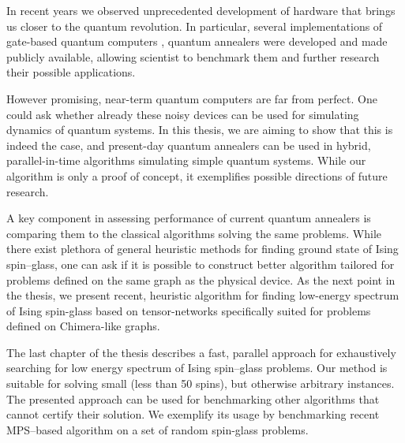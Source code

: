 In recent years we observed unprecedented development of hardware that brings us closer to the quantum revolution. In particular, several implementations of gate-based quantum computers \cite{ionq, bohnet}, quantum annealers \cite{johnson, dattani} were developed and made publicly available, allowing scientist to benchmark them and further research their possible applications.

However promising, near-term quantum computers are far from perfect. One could ask whether already these noisy devices can be used for simulating dynamics of quantum systems. In this thesis, we are aiming to show that this is indeed the case, and present-day quantum annealers can be used in hybrid, parallel-in-time algorithms simulating simple quantum systems. While our algorithm is only a proof of concept, it exemplifies possible directions of future research.

A key component in assessing performance of current quantum annealers is comparing them to the classical algorithms solving the same problems. While there exist plethora of general heuristic methods for finding ground state of Ising spin--glass, one can ask if it is possible to construct better algorithm tailored for problems defined on the same graph as the physical device. As the next point in the thesis, we present recent, heuristic algorithm for finding low-energy spectrum of Ising spin-glass based on tensor-networks specifically suited for problems defined on Chimera-like graphs.

The last chapter of the thesis describes a fast, parallel approach for exhaustively searching for low energy spectrum of Ising spin--glass problems. Our method is suitable for solving small (less than 50 spins), but otherwise arbitrary instances. The presented approach can be used for benchmarking other algorithms that cannot certify their solution. We exemplify its usage by benchmarking recent MPS--based algorithm on a set of random spin-glass problems.

